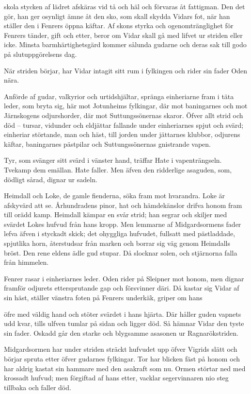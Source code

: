 skola stycken af lädret afskäras vid tå och häl och förvaras åt
fattigman. Den det gör, han ger osynligt ämne åt den sko, som skall
skydda Vidars fot, när han ställer den i Fenrers öppna käftar. Af skons
styrka och ogenomtränglighet för Fenrers tänder, gift och etter, beror
om Vidar skall gå med lifvet ur striden eller icke. Minsta
barmhärtighetsgärd kommer sålunda gudarne och deras sak till godo på
slutuppgörelsens dag.

När striden börjar, har Vidar intagit sitt rum i fylkingen och rider sin
fader Oden nära.

Anförde af gudar, valkyrior och urtidshjältar, spränga einheriarne fram
i täta leder, som bryta sig, här mot Jotunheims fylkingar, där mot
baningarnes och mot Järnskogens odjurshorder, där mot Suttungssönernas
skaror. Öfver allt strid och död -- tursar, vidunder och eldjättar
fallande under einheriarnes spjut och svärd; einheriar störtande, man
och häst, till jorden under jättarnes klubbor, odjurens käftar,
baningarnes pästpilar och Suttungssönernas gnistrande vapen.

Tyr, som svänger sitt svärd i vänster hand, träffar Hate i
vapenträngseln. Tvekamp dem emällan. Hate faller. Men äfven den
ridderlige asaguden, som, dödligt sårad, dignar ur sadeln.

Heimdall och Loke, de gamle fienderna, söka fram mot hvarandra. Loke är
afskyvärd att se. Århundradens pinor, hat och hämdekänslor drifva honom
fram till orädd kamp. Heimdall kämpar en svår strid; han segrar och
skiljer med svärdet Lokes hufvud från hans kropp. Men lemmarne af
Midgardsormens fader lefva äfven i styckadt skick; det ohyggliga
hufvudet, fullsatt med pästladdade, spjutlika horn, återstudsar från
marken och borrar sig väg genom Heimdalls bröst. Den rene eldens ädle
gud stupar. Då slocknar solen, och stjärnorna falla från himmelen.

Fenrer rasar i einheriarnes leder. Oden rider på Sleipner mot honom, men
dignar framför odjurets ettersprutande gap och försvinner däri. Då
kastar sig Vidar af sin häst, ställer vänstra foten på Fenrers underkäk,
griper om hans

öfre med väldig hand och stöter svärdet i hans hjärta. Där håller guden
vapnets udd kvar, tills ulfven tumlar på sidan och ligger död. Så hämnar
Vidar den tyste sin fader. Oskadd går den starke och blygsamme asasonen
ur Ragnarökstriden.

Midgardsormen har under striden sträckt hufvudet upp öfver Vigrids slätt
och börjar spruta etter öfver gudarnes fylkingar. Tor har blicken fäst
på honom och har aldrig kastat sin hammare med den asakraft som nu.
Ormen störtar ned med krossadt hufvud; men förgiftad af hans etter,
vacklar segervinnaren nio steg tillbaka och faller död.

